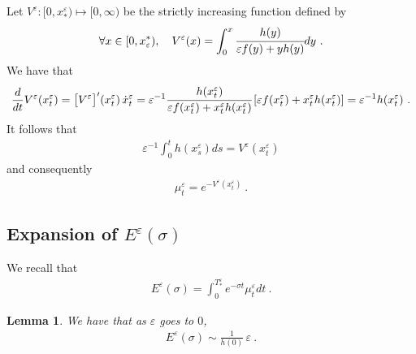\documentclass[reqno, 12pt, a4paper]{amsart}
\theoremstyle{plain}
\newtheorem{lemma}[theorem]{Lemma}
\theoremstyle{definition}
\begin{document}
Let $V^\varepsilon:[0, x^\varepsilon_*) \mapsto [0,\infty)$ be the strictly increasing function defined by 
\begin{equation}
\label{eq:Vepsilon}
\begin{split}
\forall x \in [0,x_\varepsilon^*), \quad V^\varepsilon (x)= \int_0^x \cfrac{h(y)}{\varepsilon f(y) + y h(y)} dy \ .
\end{split}
\end{equation}
We have that 
\begin{equation}
\begin{split}
\frac{d}{dt} V^\varepsilon (x^\varepsilon_t) = \big[V^\varepsilon\big]^\prime  (x^\varepsilon_t) \,  {\dot x}^\varepsilon_t = \varepsilon^{-1} \cfrac{h(x^\varepsilon_t)}{\varepsilon f(x^\varepsilon_t) + x^\varepsilon_t h(x^\varepsilon_t)} \, [ \varepsilon f(x^\varepsilon_t) + x^\varepsilon_t h(x^\varepsilon_t)] = \varepsilon^{-1} h(x^\varepsilon_t) \ .
\end{split}
\end{equation}
It follows that
\begin{equation}
\begin{split}
\varepsilon^{-1} \int_0^t h(x^\varepsilon_s) ds = V^\varepsilon (x^\varepsilon_t) 
\end{split}
\end{equation}
and consequently 
\begin{equation}
\label{eq:muV}
\begin{split}
\mu^\varepsilon_t = e^{- V^\varepsilon (x^\varepsilon_t)} \ .
\end{split}
\end{equation}

\bigskip



\subsection{Expansion of $E^\varepsilon (\sigma)$}


We recall that
\begin{equation}
\begin{split}
E^\varepsilon(\sigma)= \int_0^{T_*^\varepsilon} e^{-\sigma t} \mu^\varepsilon_t dt \ . 
\end{split}
\end{equation}

\begin{lemma}
We have that as $\varepsilon$ goes to $0$, 
\begin{equation}
\begin{split}
E^\varepsilon(\sigma) \sim \frac{1}{h(0)} \, \varepsilon \ .
\end{split}
\end{equation}
\end{lemma}
\end{document}
